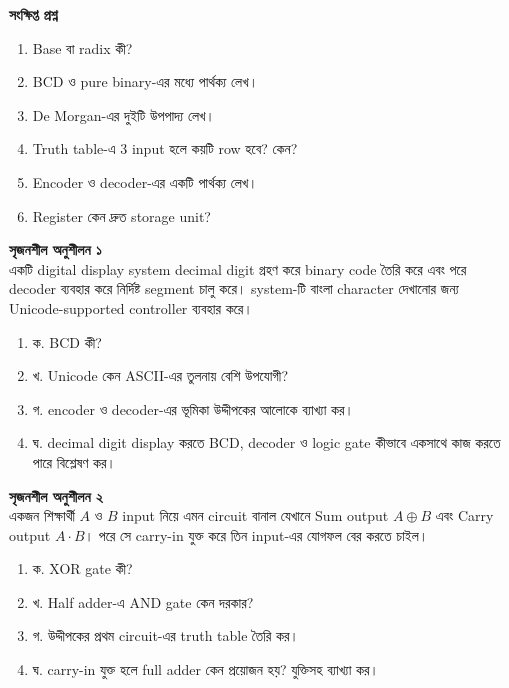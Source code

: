 \begin{practicebox}
\textbf{সংক্ষিপ্ত প্রশ্ন}
\begin{enumerate}
\item Base বা radix কী?
\item BCD ও pure binary-এর মধ্যে পার্থক্য লেখ।
\item De Morgan-এর দুইটি উপপাদ্য লেখ।
\item Truth table-এ 3 input হলে কয়টি row হবে? কেন?
\item Encoder ও decoder-এর একটি পার্থক্য লেখ।
\item Register কেন দ্রুত storage unit?
\end{enumerate}
\end{practicebox}

\begin{practicebox}
\textbf{সৃজনশীল অনুশীলন ১}\\
একটি digital display system decimal digit গ্রহণ করে binary code তৈরি করে এবং পরে decoder ব্যবহার করে নির্দিষ্ট segment চালু করে। system-টি বাংলা character দেখানোর জন্য Unicode-supported controller ব্যবহার করে।

\begin{enumerate}
\item ক. BCD কী?
\item খ. Unicode কেন ASCII-এর তুলনায় বেশি উপযোগী?
\item গ. encoder ও decoder-এর ভূমিকা উদ্দীপকের আলোকে ব্যাখ্যা কর।
\item ঘ. decimal digit display করতে BCD, decoder ও logic gate কীভাবে একসাথে কাজ করতে পারে বিশ্লেষণ কর।
\end{enumerate}
\end{practicebox}

\begin{practicebox}
\textbf{সৃজনশীল অনুশীলন ২}\\
একজন শিক্ষার্থী $A$ ও $B$ input নিয়ে এমন circuit বানাল যেখানে Sum output $A\oplus B$ এবং Carry output $A\cdot B$। পরে সে carry-in যুক্ত করে তিন input-এর যোগফল বের করতে চাইল।

\begin{enumerate}
\item ক. XOR gate কী?
\item খ. Half adder-এ AND gate কেন দরকার?
\item গ. উদ্দীপকের প্রথম circuit-এর truth table তৈরি কর।
\item ঘ. carry-in যুক্ত হলে full adder কেন প্রয়োজন হয়? যুক্তিসহ ব্যাখ্যা কর।
\end{enumerate}
\end{practicebox}

